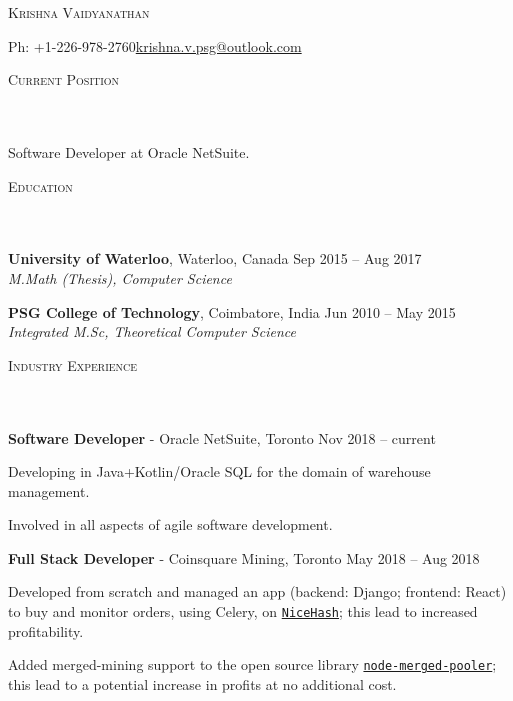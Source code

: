 \documentclass{article}
\newcommand{\header}[1]{{
\hspace*{-15pt}\vspace*{6pt} \textsc{#1}} \vspace*{-6pt} 
\lineunder
}
\newcommand{\lineunder}{
\vspace*{-8pt} \\ \hspace*{-18pt} 
\hrulefill \\
}
\newcommand{\content}{
\vspace*{2pt}%
}
\newcommand{\college}[5]{\vspace*{2pt}%
#1 \hfill #2 \\ #3 \hfill #4
\vspace*{5pt}
}
\newcommand{\employer}[4]{{
\vspace*{2pt}%
\textbf{#1} - #2 \hfill #3\\ #4 \vspace*{2pt}}
}
\renewcommand{\labelitemii}{
$\vcenter{\hbox{\tiny$\bullet$}}$\hspace*{-3pt}
}
\newenvironment{bullet-list-minor}{
\begin{list}{\labelitemii}{\setlength\leftmargin{15pt} 
\topsep 0pt \itemsep -2pt}}{\vspace*{4pt}\end{list}
}
\begin{document}
\small
\smallskip
\vspace*{-65pt}

\begin{center}
    {\large \scshape{Krishna Vaidyanathan}}
\end{center}
    Ph: +1-226-978-2760\hfill \href{mailto:krishna.v.psg@outlook.com}{krishna.v.psg@outlook.com} \\
\vspace{15pt}

\header{Current Position}
    \content{Software Developer at Oracle NetSuite.}


\vspace*{4pt}%
\header{Education}
    \college{\textbf{University of Waterloo}, Waterloo, Canada}{Sep 2015 -- Aug 2017}
    {\textit{M.Math (Thesis), Computer Science}}{}\\

    \college{\textbf{PSG College of Technology}, Coimbatore, India}{Jun 2010 -- May 2015}
    {\textit{Integrated M.Sc, Theoretical Computer Science}}{}\\

\vspace*{4pt}%
\header{Industry Experience}
  \employer{Software Developer}{Oracle NetSuite,
        Toronto}{Nov 2018 -- current}{}
	\begin{bullet-list-minor}
	\item Developing in Java+Kotlin/Oracle SQL for the domain of warehouse management.
	\item Involved in all aspects of agile software development.
    \end{bullet-list-minor}

    \employer{Full Stack Developer}{Coinsquare Mining,
        Toronto}{May 2018 -- Aug 2018}{}
	\begin{bullet-list-minor}
	\item Developed from scratch and managed an app (backend: Django; frontend: React) to buy and monitor
orders, using Celery, on \texttt{\href{www.nicehash.com}{NiceHash}};  this lead to increased profitability. 
	\item Added merged-mining support to the open source library \texttt{\href{https://github.com/UNOMP/node-merged-pool}{node-merged-pooler}}; this lead to a potential increase in profits at no additional cost.
    \end{bullet-list-minor}
\end{document}
